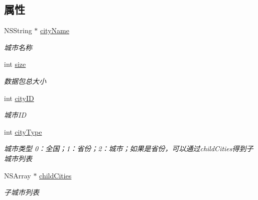\subsection*{属性}
\begin{DoxyCompactItemize}
\item 
\hypertarget{interface_b_m_k_o_l_search_record_a9b511c21c21f4b67eef345b11c0e9826}{}N\+S\+String $\ast$ \hyperlink{interface_b_m_k_o_l_search_record_a9b511c21c21f4b67eef345b11c0e9826}{city\+Name}\label{interface_b_m_k_o_l_search_record_a9b511c21c21f4b67eef345b11c0e9826}

\begin{DoxyCompactList}\small\item\em 城市名称 \end{DoxyCompactList}\item 
\hypertarget{interface_b_m_k_o_l_search_record_a65d925120ac45eec0047bad23225f67f}{}int \hyperlink{interface_b_m_k_o_l_search_record_a65d925120ac45eec0047bad23225f67f}{size}\label{interface_b_m_k_o_l_search_record_a65d925120ac45eec0047bad23225f67f}

\begin{DoxyCompactList}\small\item\em 数据包总大小 \end{DoxyCompactList}\item 
\hypertarget{interface_b_m_k_o_l_search_record_a45d36f0768cca26895c7078900ad8d7b}{}int \hyperlink{interface_b_m_k_o_l_search_record_a45d36f0768cca26895c7078900ad8d7b}{city\+I\+D}\label{interface_b_m_k_o_l_search_record_a45d36f0768cca26895c7078900ad8d7b}

\begin{DoxyCompactList}\small\item\em 城市\+I\+D \end{DoxyCompactList}\item 
\hypertarget{interface_b_m_k_o_l_search_record_a74c11b249d3d97503c4a4efa880cc99a}{}int \hyperlink{interface_b_m_k_o_l_search_record_a74c11b249d3d97503c4a4efa880cc99a}{city\+Type}\label{interface_b_m_k_o_l_search_record_a74c11b249d3d97503c4a4efa880cc99a}

\begin{DoxyCompactList}\small\item\em 城市类型 0：全国；1：省份；2：城市；如果是省份，可以通过child\+Cities得到子城市列表 \end{DoxyCompactList}\item 
\hypertarget{interface_b_m_k_o_l_search_record_a883fcb06413f7da8b4e8a50e038a3e78}{}N\+S\+Array $\ast$ \hyperlink{interface_b_m_k_o_l_search_record_a883fcb06413f7da8b4e8a50e038a3e78}{child\+Cities}\label{interface_b_m_k_o_l_search_record_a883fcb06413f7da8b4e8a50e038a3e78}

\begin{DoxyCompactList}\small\item\em 子城市列表 \end{DoxyCompactList}\end{DoxyCompactItemize}


